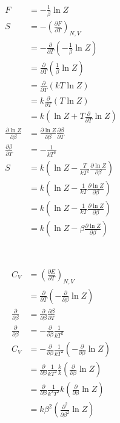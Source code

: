 \documentclass{report}
\begin{document}
\begin{align*}
	F &= - \frac{1}{\beta} \ln Z\\
	S &= - \left( \frac{\partial F}{\partial T} \right)_{N, V}\\
	&= - \frac{\partial}{\partial T} \left( - \frac{1}{\beta} \ln Z \right)\\
	&= \frac{\partial}{\partial T} \left( \frac{1}{\beta} \ln Z \right)\\
	&= \frac{\partial}{\partial T} \left( kT \ln Z \right)\\
	&= k \frac{\partial}{\partial T} \left( T \ln Z \right)\\
	&= k \left( \ln Z + T \frac{\partial}{\partial T} \ln Z \right) \\
	\frac{\partial \ln Z}{\partial \beta} &= \frac{\partial \ln Z}{\partial \beta} \frac{\partial \beta}{\partial T}\\
	\frac{\partial \beta}{\partial T} &=  - \frac{1}{k T^2}\\
	S &= k \left( \ln Z - \frac{T}{k T^2} \frac{\partial \ln Z}{\partial \beta} \right) \\
	&= k \left( \ln Z - \frac{1}{k T} \frac{\partial \ln Z}{\partial \beta} \right) \\
	&= k \left( \ln Z - \frac{1}{k T} \frac{\partial \ln Z}{\partial \beta} \right) \\
	&= k \left( \ln Z - \beta \frac{\partial \ln Z}{\partial \beta} \right) \\
\end{align*}

\section{}

\begin{align*}
	C_V &= \left( \frac{\partial E}{\partial T} \right)_{N,V}\\
	&= \frac{\partial}{\partial T} \left( - \frac{\partial}{\partial \beta} \ln Z \right)\\
	\frac{\partial}{\partial \beta} &= \frac{\partial}{\partial \beta}\frac{\partial \beta}{\partial T}\\
	\frac{\partial}{\partial \beta} &=  - \frac{\partial}{\partial \beta}\frac{1}{kT^2}\\
	C_V &= - \frac{\partial}{\partial \beta} \frac{1}{kT^2} \left(- \frac{\partial}{\partial \beta} \ln Z \right)\\
	&=\frac{\partial}{\partial \beta} \frac{1}{kT^2} \frac{k}{k} \left(\frac{\partial}{\partial\beta} \ln Z \right)\\
	&=\frac{\partial}{\partial \beta} \frac{1}{k^2T^2} k \left(\frac{\partial}{\partial \beta} \ln Z \right)\\
	&= k\beta^2 \left(\frac{\partial^2}{\partial \beta^2} \ln Z \right)
\end{align*}
\end{document}
